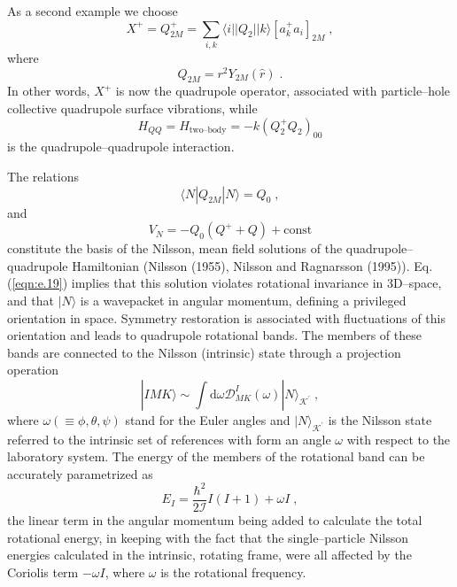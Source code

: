 \documentclass[a4paper,onecolumn,superscriptaddress,12pt,nofootinbib,twoside,raggedfooter,notitlepage]{revtex4-1}
\begin{document}
As a second example we choose
\begin{equation}
	X^+ = Q_{2M}^+ = \sum_{i,k} \langle i || Q_2 || k \rangle \left[ a_k^+ a_i \right]_{2M} \;,
	\label{eqn:e.16}
\end{equation}
where
\begin{equation}
	Q_{2M} = r^2 Y_{2M} ( \hat{r} ) \;.
	\label{eqn:e.17}
\end{equation}
In other words, $X^+$ is now the quadrupole operator, associated with particle--hole collective quadrupole surface vibrations, while
\begin{equation}
	H_{QQ} = H_\textrm{two--body} = - k \left( Q_2^+ Q_2 \right)_{00}
	\label{eqn:e.18}
\end{equation}
is the quadrupole--quadrupole interaction.

The relations
\begin{equation}
	\langle N | Q_{2M} | N \rangle = Q_0 \;,
	\label{eqn:e.19}
\end{equation}
and
\begin{equation}
	V_N = - Q_0 \left( Q^+ + Q \right) + \textrm{const} 
	\label{eqn:e.20}
\end{equation}
constitute the basis of the Nilsson, mean field solutions of the quadrupole--quadrupole Hamiltonian (Nilsson (1955), Nilsson and Ragnarsson (1995)). Eq. (\ref{eqn:e.19}) implies that this solution violates rotational invariance in 3D--space, and that $|N \rangle$ is a wavepacket in angular momentum, defining a privileged orientation in space. Symmetry restoration is associated with fluctuations of this orientation and leads to quadrupole rotational bands. The members of these bands are connected to the Nilsson (intrinsic) state through a projection operation
\begin{equation}
	|IMK \rangle \sim \int \textrm{d}\omega \mathcal{D}_{MK}^I (\omega) |N\rangle_{\mathcal{K}^\prime} \;,
	\label{eqn:e.21}
\end{equation}
where $\omega ( \equiv \phi, \theta, \psi )$ stand for the Euler angles and $|N \rangle_{\mathcal{K}^\prime}$ is the Nilsson state referred to the intrinsic set of references with form an angle $\omega$ with respect to the laboratory system. The energy of the members of the rotational band can be accurately parametrized as
\begin{equation}
	E_I = \frac{\hbar^2}{2 \mathcal{I}} I (I+1) + \omega I \;,
	\label{eqn:e.22}
\end{equation}
the linear term in the angular momentum being added to calculate the total rotational energy, in keeping with the fact that the single--particle Nilsson energies calculated in the intrinsic, rotating frame, were all affected by the Coriolis term $-\omega I$, where $\omega$ is the rotational frequency.
\end{document}

